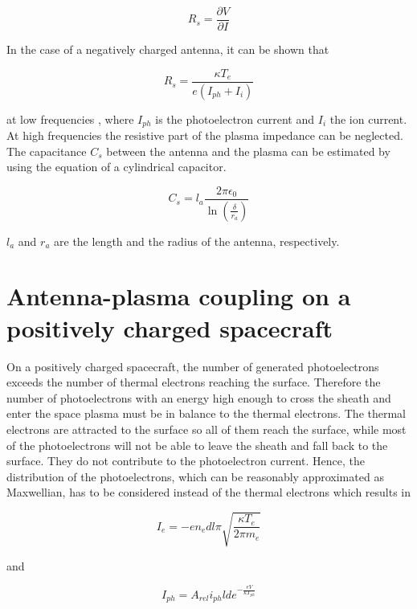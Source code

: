 \documentclass[a4paper,11pt]{thesis}
\begin{document}
\begin{equation}
R_s=\frac{\partial V}{\partial I}
\end{equation}

In the case of a negatively charged antenna, it can be shown that

\begin{equation}
R_s=\frac{\kappa T_e}{e(I_{ph}+I_i)}
\end{equation}

at low frequencies \cite{gurnett98}, where $I_{ph}$ is the photoelectron current and $I_i$ the ion current. At high frequencies the resistive part of the plasma impedance can be neglected. The capacitance $C_s$ between the antenna and the plasma can be estimated by using the equation of a cylindrical capacitor.

\begin{equation}
C_s=l_a\frac{2\pi \epsilon_0}{\ln{\left( \frac{\delta}{r_a} \right)}}
\end{equation}

$l_a$ and $r_a$ are the length and the radius of the antenna, respectively.

\section{Antenna-plasma coupling on a positively charged spacecraft}
On a positively charged spacecraft, the number of generated photoelectrons exceeds the number of thermal electrons reaching the surface. Therefore the number of photoelectrons with an energy high enough to cross the sheath and enter the space plasma must be in balance to the thermal electrons. The thermal electrons are attracted to the surface so all of them reach the surface, while most of the photoelectrons will not be able to leave the sheath and fall back to the surface. They do not contribute to the photoelectron current. Hence, the distribution of the photoelectrons, which can be reasonably approximated as Maxwellian, has to be considered instead of the thermal electrons which results in

\begin{equation}
I_e=-en_e dl\pi \sqrt{\frac{\kappa T_e}{2\pi m_e}}
\end{equation}

and

\begin{equation}\label{eq:ph_current_positive_sc}
I_{ph} = A_{rel} i_{ph}ld e^{-\frac{eV}{\kappa T_{ph}}}
\end{equation}
\end{document}
